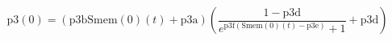 \begin{equation}
\text{p3}(0)=(\text{p3b} \text{Smem}(0)(t)+\text{p3a}) \left(\frac{1-\text{p3d}}{e^{\text{p3f} (\text{Smem}(0)(t)-\text{p3e})}+1}+\text{p3d}\right)
\end{equation}

